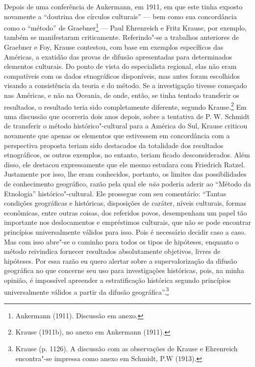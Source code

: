 Depois de uma conferência de Ankermann, em 1911, em que este tinha
exposto novamente a ``doutrina dos círculos culturais'' --- bem como sua
concordância como o ``método'' de Graebner\footnote{Ankermann (1911).
  Discussão em anexo.} --- Paul Ehrenreich e Fritz Krause, por exemplo,
também se manifestaram criticamente. Referindo"-se a trabalhos
anteriores de Graebner e Foy, Krause contestou, com base em exemplos
específicos das Américas, a exatidão das provas de difusão apresentadas
para determinados elementos culturais. Do ponto de vista do especialista
regional, elas não eram compatíveis com os dados etnográficos
disponíveis, mas antes foram escolhidos visando a consistência da teoria
e do método. Se a investigação tivesse começado nas Américas, e não na
Oceania, de onde, então, se tinha tentado transferir os resultados, o
resultado teria sido completamente diferente, segundo Krause.\footnote{Krause
  (1911b), no anexo em Ankermann (1911).} Em uma discussão que ocorreria
dois anos depois, sobre a tentativa de P. W. Schmidt de transferir o
método histórico"-cultural para a América do Sul, Krause criticou
novamente que apenas os elementos que estivessem em concordância com a
perspectiva proposta teriam sido destacados da totalidade dos resultados
etnográficos, os outros exemplos, no entanto, teriam ficado
desconsiderados. Além disso, ele destacou expressamente que ele mesmo
estudara com Friedrich Ratzel. Justamente por isso, lhe eram
conhecidos, portanto, os limites das possibilidades de conhecimento
geográfico, razão pela qual ele \emph{não} poderia aderir ao ``Método da
Etnologia'' histórico"-cultural. Ele prossegue com seu comentário:
``Tantas condições geográficas e históricas, disposições de caráter,
níveis culturais, formas econômicas, entre outras coisas, dos referidos
povos, desempenham um papel tão importante nos deslocamentos e
empréstimos culturais, que não se pode encontrar princípios
universalmente válidos para isso. Pois é necessário decidir caso a
caso. Mas com isso abre"-se o caminho para todos os tipos de hipóteses,
enquanto o método reivindica fornecer resultados absolutamente
objetivos, livres de hipóteses. Por essa razão eu quero alertar sobre a
supervalorização da difusão geográfica no que concerne seu uso para
investigações históricas, pois, na minha opinião, é impossível apreender
a estratificação histórica segundo princípios universalmente válidos a
partir da difusão geográfica''.\footnote{Krause (p. 1126). A discussão
  com as observações de Krause e Ehrenreich encontra"-se impressa como
  anexo em Schmidt, P.W (1913).}

